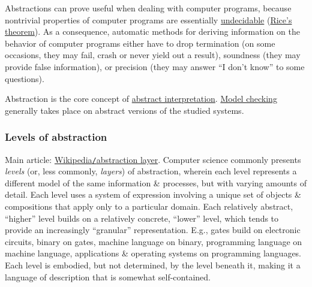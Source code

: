 \documentclass{article}
\begin{document}
Abstractions can prove useful when dealing with computer programs, because nontrivial properties of computer programs are essentially \href{https://en.wikipedia.org/wiki/Undecidable_problem}{undecidable} (\href{https://en.wikipedia.org/wiki/Rice%27s_theorem}{Rice's theorem}). As a consequence, automatic methods for deriving information on the behavior of computer programs either have to drop termination (on some occasions, they may fail, crash or never yield out a result), soundness (they may provide false information), or precision (they may answer ``I don't know'' to some questions).

Abstraction is the core concept of \href{https://en.wikipedia.org/wiki/Abstract_interpretation}{abstract interpretation}. \href{https://en.wikipedia.org/wiki/Model_checking}{Model checking} generally takes place on abstract versions of the studied systems.

\subsubsection{Levels of abstraction}
Main article: \href{https://en.wikipedia.org/wiki/Abstraction_layer}{Wikipedia{\tt/}abstraction layer}. Computer science commonly presents {\it levels} (or, less commonly, {\it layers}) of abstraction, wherein each level represents a different model of the same information \& processes, but with varying amounts of detail. Each level uses a system of expression involving a unique set of objects \& compositions that apply only to a particular domain. Each relatively abstract, ``higher'' level builds on a relatively concrete, ``lower'' level, which tends to provide an increasingly ``granular'' representation. E.g., gates build on electronic circuits, binary on gates, machine language on binary, programming language on machine language, applications \& operating systems on programming languages. Each level is embodied, but not determined, by the level beneath it, making it a language of description that is somewhat self-contained.
\end{document}
